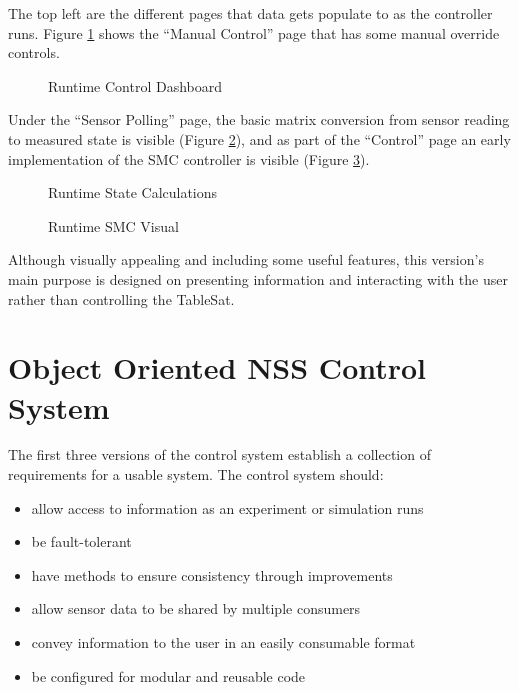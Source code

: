 The top left are the different pages that data gets populate to as the controller runs.  Figure \ref{fig:RuntimeControlDashboard} shows the ``Manual Control'' page that has some manual override controls.

\begin{figure}[H]
  \centerline{}
  \caption{Runtime Control Dashboard}
  \label{fig:RuntimeControlDashboard}
\end{figure}

Under the ``Sensor Polling'' page, the basic matrix conversion from sensor reading to measured state is visible (Figure \ref{fig:RuntimeStateCalculations}), and as part of the ``Control'' page an early implementation of the SMC controller is visible (Figure \ref{fig:RuntimeSMCVisual}).

\begin{figure}[H]
  \centerline{}
  \caption{Runtime State Calculations}
  \label{fig:RuntimeStateCalculations}
\end{figure}

\begin{figure}[H]
  \centerline{}
  \caption{Runtime SMC Visual}
  \label{fig:RuntimeSMCVisual}
\end{figure}

Although visually appealing and including some useful features, this version's main purpose is designed on presenting information and interacting with the user rather than controlling the TableSat.

\section{Object Oriented NSS Control System}
\label{sec:ObjectOrientedNSSControlSystem}

The first three versions of the control system establish a collection of requirements for a usable system.  The control system should:

\begin{itemize}
\item allow access to information as an experiment or simulation runs
\item be fault-tolerant
\item have methods to ensure consistency through improvements
\item allow sensor data to be shared by multiple consumers
\item convey information to the user in an easily consumable format
\item be configured for modular and reusable code
\end{itemize}

